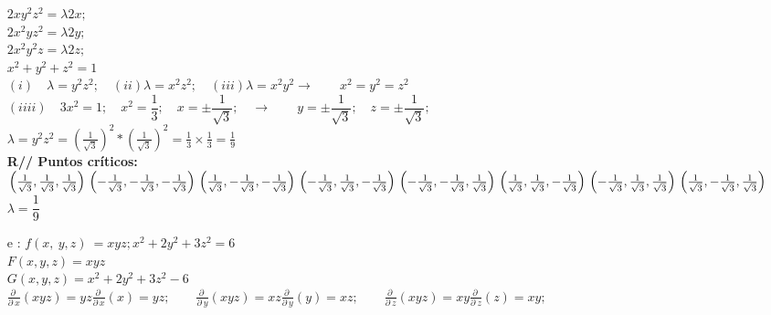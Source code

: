 \documentclass[13pt]{memoir}
\begin{document}
\begin{enumerate}
$2xy^2z^2 = \lambda 2x;$\\
$2x^2yz^2 = \lambda 2y;$\\
$2x^2y^2z = \lambda 2z;$\\
$x^2+y^2+z^2 = 1$\\

$(i)\quad \lambda = y^2 z^2; \quad(ii) \lambda = x^2 z^2; \quad(iii) \lambda = x^2 y^2 \rightarrow\qquad  x^2 = y^2 = z^2 $\\
$(iiii)\quad 3x^2 = 1 ;\quad x^2 = \dfrac{1}{3} ;\quad  x = \pm\dfrac{1}{\sqrt{3}};\quad \rightarrow\qquad y = \pm\dfrac{1}{\sqrt{3}};\quad z = \pm\dfrac{1}{\sqrt{3}};$\\

$\lambda = y^2z^2 = \left(\frac{1}{\sqrt{3}}\right)^2 * \left(\frac{1}{\sqrt{3}}\right)^2 = \frac{1}{3} \times \frac{1}{3} = \frac{1}{9}$\\

\textbf{R// Puntos críticos: }\\
$\left(\frac{1}{\sqrt{3}}, \frac{1}{\sqrt{3}}, \frac{1}{\sqrt{3}}\right) \\
\left(-\frac{1}{\sqrt{3}}, -\frac{1}{\sqrt{3}}, -\frac{1}{\sqrt{3}}\right) \\
\left(\frac{1}{\sqrt{3}}, -\frac{1}{\sqrt{3}}, -\frac{1}{\sqrt{3}}\right) \\
\left(-\frac{1}{\sqrt{3}}, \frac{1}{\sqrt{3}}, -\frac{1}{\sqrt{3}}\right) \\
\left(-\frac{1}{\sqrt{3}}, -\frac{1}{\sqrt{3}}, \frac{1}{\sqrt{3}}\right) \\
\left(\frac{1}{\sqrt{3}}, \frac{1}{\sqrt{3}}, -\frac{1}{\sqrt{3}}\right) \\
\left(-\frac{1}{\sqrt{3}}, \frac{1}{\sqrt{3}}, \frac{1}{\sqrt{3}}\right) \\
\left(\frac{1}{\sqrt{3}}, -\frac{1}{\sqrt{3}}, \frac{1}{\sqrt{3}}\right)
$\\
$\lambda = \dfrac{1}{9}$\\

\item[ e]: $f\left(x,\:y,z\right)\:= xyz; x^2 +2y^2 + 3z^2 = 6 $ \\

$F(x, y, z) = xyz$ \\
$G(x, y, z) = x^2 +2y^2 + 3z^2 - 6$\\

$\frac{\partial \:}{\partial \:x}\left(xyz\right) = yz\frac{\partial \:}{\partial \:x}\left(x\right)=yz; \qquad \frac{\partial \:}{\partial \:y}\left(xyz\right) = xz\frac{\partial \:}{\partial \:y}\left(y\right) =xz; \qquad \frac{\partial \:}{\partial \:z}\left(xyz\right) =xy\frac{\partial \:}{\partial \:z}\left(z\right) =xy; $\\


\end{enumerate}
\end{document}
